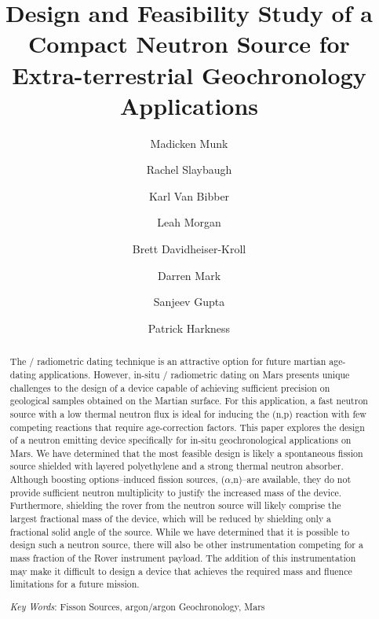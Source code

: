 \documentclass{mc2015}
\begin{document}
\title{Design and Feasibility Study of a Compact Neutron Source for Extra-terrestrial Geochronology Applications}

\author{Madicken Munk}
\author{Rachel Slaybaugh}
\author{Karl Van Bibber}

\author{Leah Morgan}
\author{Brett Davidheiser-Kroll}
\author{Darren Mark}
\author{Sanjeev Gupta}
\author{Patrick Harkness}

\maketitle

\begin{abstract}
The / radiometric dating technique is an attractive option for future martian age-dating applications. However, in-situ / radiometric dating on Mars presents unique challenges to the design of a device capable of achieving sufficient precision on geological samples obtained on the Martian surface. For this application, a fast neutron source with a low thermal neutron flux is ideal for inducing the (n,p) reaction with few competing reactions that require age-correction factors. This paper explores the design of a neutron emitting device specifically for in-situ geochronological applications on Mars. We have determined that the most feasible design is likely a  spontaneous fission source shielded with layered polyethylene and a strong thermal neutron absorber. Although boosting options--induced fission sources, ($\alpha$,n)--are available, they do not provide sufficient neutron multiplicity to justify the increased mass of the device. Furthermore, shielding the rover from the neutron source will likely comprise the largest fractional mass of the device, which will be reduced by shielding only a fractional solid angle of the source. While we have determined that it is possible to design such a neutron source, there will also be other instrumentation competing for a mass fraction of the Rover instrument payload. The addition of this instrumentation may make it difficult to design a device that achieves the required mass and fluence limitations for a future mission.   

\emph{Key Words}: Fisson Sources, argon/argon Geochronology, Mars
\end{abstract}
\end{document}
